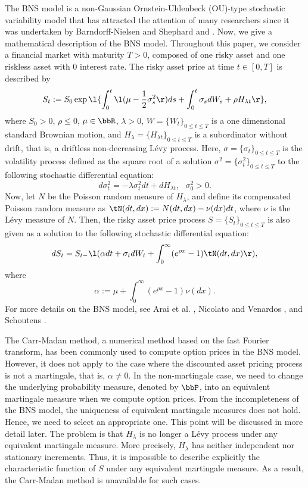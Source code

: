 The BNS model is a non-Gaussian Ornstein-Uhlenbeck (OU)-type stochastic variability model that has attracted the attention of many researchers
since it was undertaken by Barndorff-Nielsen and Shephard \cite{BNS1} and \cite{BNS2}.
Now, we give a mathematical description of the BNS model.
Throughout this paper, we consider a financial market with maturity $T>0$, composed of one risky asset and one riskless asset with 0 interest rate.
The risky asset price at time $t\in[0,T]$ is described by
\begin{equation}\label{eq-BNS}
S_t:=S_0\exp\l\{\int_0^t\l(\mu-\frac{1}{2}\sigma_s^2\r)ds+\int_0^t\sigma_sdW_s+\rho H_{\lambda t}\r\},
\end{equation}
where $S_0>0$, $\rho\leq0$, $\mu\in\bbR$, $\lambda>0$, $W=\{W_t\}_{0\leq t\leq T}$ is a one dimensional standard Brownian motion, and
$H_\lambda=\{H_{\lambda t}\}_{0\leq t\leq T}$ is a subordinator without drift, that is, a driftless non-decreasing L\'evy process.
Here, $\sigma=\{\sigma_t\}_{0\leq t\leq T}$ is the volatility process defined as the square root of a solution $\sigma^2=\{\sigma^2_t\}_{0\leq t\leq T}$
to the following stochastic differential equation:
\begin{equation}\label{sigma-SDE}
d\sigma_t^2 = -\lambda\sigma_t^2dt+dH_{\lambda t}, \ \ \ \sigma_0^2>0.
\end{equation}
Now, let $N$ be the Poisson random measure of $H_\lambda$, and define its compensated Poisson random measure as $\tN(dt,dx):=N(dt,dx)-\nu(dx)dt$,
where $\nu$ is the L\'evy measure of $N$.
Then, the risky asset price process $S=\{S_t\}_{0\leq t\leq T}$ is also given as a solution to the following stochastic differential equation:
\[
dS_t = S_{t-}\l(\alpha dt+\sigma_t dW_t + \int_0^\infty(e^{\rho x}-1)\tN(dt,dx)\r),
\]
where
\[
\alpha:=\mu+\int_0^\infty(e^{\rho x}-1)\nu(dx).
\]
For more details on the BNS model, see Arai et al. \cite{AIS-BNS}, Nicolato and Venardos \cite{NV}, and Schoutens \cite{Scho}.

The Carr-Madan method, a numerical method based on the fast Fourier transform, has been commonly used to compute option prices in the BNS model.
However, it does not apply to the case where the discounted asset pricing process is not a martingale, that is, $\alpha\neq0$.
In the non-martingale case, we need to change the underlying probability measure, denoted by $\bbP$,
into an equivalent martingale measure when we compute option prices.
From the incompleteness of the BNS model, the uniqueness of equivalent martingale measures does not hold.
Hence, we need to select an appropriate one. This point will be discussed in more detail later.
The problem is that $H_\lambda$ is no longer a L\'evy process under any equivalent martingale measure.
More precisely, $H_\lambda$ has neither independent nor stationary increments.
Thus, it is impossible to describe explicitly the characteristic function of $S$ under any equivalent martingale measure.
As a result, the Carr-Madan method is unavailable for such cases.

